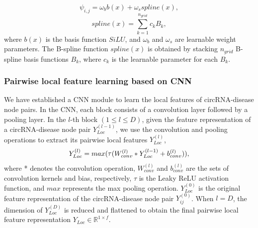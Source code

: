 \documentclass{bioinfo}
\begin{document}
\begin{methods}
\begin{equation}
    \psi_{i,j} = \omega_{b}b(x) + \omega_{s}spline(x),
\end{equation}
\begin{equation}
    spline(x) = \sum_{k = 1}^{n_{grid}}c_{k} B_{k},
\end{equation}
where $b(x)$ is the basis function ${SiLU}$, and $\omega_{b}$ and $\omega_{s}$ are learnable weight parameters. The B-spline function $spline(x)$ is obtained by stacking $n_{grid}$ B-spline basis functions $B_{k}$, where $c_{k}$ is the learnable parameter for each $B_{k}$.

\vspace{-0.3cm}

\subsubsection{Pairwise local feature learning based on CNN}
We have established a CNN module to learn the local features of circRNA-disease node pairs. In the CNN, each block consists of a convolution layer followed by a pooling layer. In the $l$-th block $(1 \leqslant l \leqslant D)$, given the feature representation of a circRNA-disease node pair ${Y}_{Loc}^{(l - 1)}$, we use the convolution and pooling operations to extract its pairwise local features ${Y}_{Loc}^{(l)}$,
\begin{equation}
{Y}_{Loc}^{(l)} = max(\mathop{\rm{\tau}}({W_{conv}^{(l)}}  * {Y}_{Loc}^{(l - 1)} + {b_{conv}^{(l)}})),
\end{equation}
where * denotes the convolution operation, $W_{conv}^{(l)}$ and $b_{conv}^{(l)}$ are the sets of convolution kernels and bias, respectively, $\tau$ is the Leaky ReLU activation function, and $max$ represents the max pooling operation. $Y_{Loc}^{(0)}$ is the original feature representation of the circRNA-disease node pair $Y_{ij}^{(0)}$. When $l = D$, the dimension of $Y_{Loc}^{(D)}$ is reduced and flattened to obtain the final pairwise local feature representation $Y_{Loc} \in \mathbb{R}^{1\times f}$.

\vspace{-0.4cm}


\end{methods}
\end{document}
